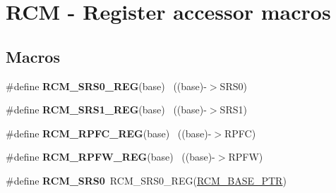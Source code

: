 \hypertarget{group___r_c_m___register___accessor___macros}{}\section{R\+C\+M -\/ Register accessor macros}
\label{group___r_c_m___register___accessor___macros}
\subsection*{Macros}
\begin{DoxyCompactItemize}
\item 
\hypertarget{group___r_c_m___register___accessor___macros_ga9a66988adfb5c993ce955b8ca7ddaa27}{}\#define {\bfseries R\+C\+M\+\_\+\+S\+R\+S0\+\_\+\+R\+E\+G}(base)                                          ~((base)-\/$>$S\+R\+S0)\label{group___r_c_m___register___accessor___macros_ga9a66988adfb5c993ce955b8ca7ddaa27}

\item 
\hypertarget{group___r_c_m___register___accessor___macros_gac6b0aff57a904ff809da2670a9b1992a}{}\#define {\bfseries R\+C\+M\+\_\+\+S\+R\+S1\+\_\+\+R\+E\+G}(base)                                          ~((base)-\/$>$S\+R\+S1)\label{group___r_c_m___register___accessor___macros_gac6b0aff57a904ff809da2670a9b1992a}

\item 
\hypertarget{group___r_c_m___register___accessor___macros_gaa5beb3c127ae8e82881dbd558ddf4ffb}{}\#define {\bfseries R\+C\+M\+\_\+\+R\+P\+F\+C\+\_\+\+R\+E\+G}(base)                                          ~((base)-\/$>$R\+P\+F\+C)\label{group___r_c_m___register___accessor___macros_gaa5beb3c127ae8e82881dbd558ddf4ffb}

\item 
\hypertarget{group___r_c_m___register___accessor___macros_ga5dd502e0c3bac4f307fbb65d51bcf2c7}{}\#define {\bfseries R\+C\+M\+\_\+\+R\+P\+F\+W\+\_\+\+R\+E\+G}(base)                                          ~((base)-\/$>$R\+P\+F\+W)\label{group___r_c_m___register___accessor___macros_ga5dd502e0c3bac4f307fbb65d51bcf2c7}

\item 
\hypertarget{group___r_c_m___register___accessor___macros_gaae0200bfd0eb1d7f7fd0d142c21fe92a}{}\#define {\bfseries R\+C\+M\+\_\+\+S\+R\+S0}~R\+C\+M\+\_\+\+S\+R\+S0\+\_\+\+R\+E\+G(\hyperlink{group___r_c_m___peripheral_ga25ab3aa8d593d455ed36a52c77f88234}{R\+C\+M\+\_\+\+B\+A\+S\+E\+\_\+\+P\+T\+R})\label{group___r_c_m___register___accessor___macros_gaae0200bfd0eb1d7f7fd0d142c21fe92a}


\end{DoxyCompactItemize}
